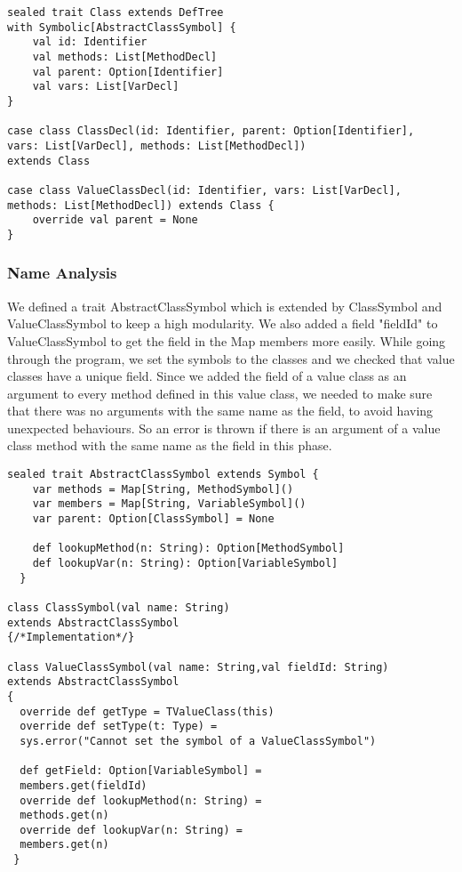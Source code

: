 \begin{verbatim}
sealed trait Class extends DefTree 
with Symbolic[AbstractClassSymbol] {
    val id: Identifier
    val methods: List[MethodDecl]
    val parent: Option[Identifier]
    val vars: List[VarDecl]
}

case class ClassDecl(id: Identifier, parent: Option[Identifier],
vars: List[VarDecl], methods: List[MethodDecl]) 
extends Class

case class ValueClassDecl(id: Identifier, vars: List[VarDecl],
methods: List[MethodDecl]) extends Class {
    override val parent = None
}
\end{verbatim}
\newpage
\subsubsection{Name Analysis}
We defined a trait AbstractClassSymbol which is extended by ClassSymbol and ValueClassSymbol to keep a high modularity.
We also added a field "fieldId" to ValueClassSymbol to get the field in the Map members more easily. \newline
While going through the program, we set the symbols to the classes and we checked that value classes have a unique field. \newline
Since we added the field of a value class as an argument to every method defined in this value class, we needed to make sure that there was no arguments with the same name as the field, to avoid having unexpected behaviours. So an error is thrown if there is an argument of a value class method with the same name as the field in this phase.
\begin{verbatim}
sealed trait AbstractClassSymbol extends Symbol {
    var methods = Map[String, MethodSymbol]()
    var members = Map[String, VariableSymbol]()
    var parent: Option[ClassSymbol] = None

    def lookupMethod(n: String): Option[MethodSymbol]
    def lookupVar(n: String): Option[VariableSymbol]
  }

class ClassSymbol(val name: String) 
extends AbstractClassSymbol 
{/*Implementation*/}
  
class ValueClassSymbol(val name: String,val fieldId: String)
extends AbstractClassSymbol
{
  override def getType = TValueClass(this)
  override def setType(t: Type) = 
  sys.error("Cannot set the symbol of a ValueClassSymbol")

  def getField: Option[VariableSymbol] =
  members.get(fieldId)
  override def lookupMethod(n: String) =
  methods.get(n)
  override def lookupVar(n: String) =
  members.get(n)
 }
\end{verbatim}
\newpage
